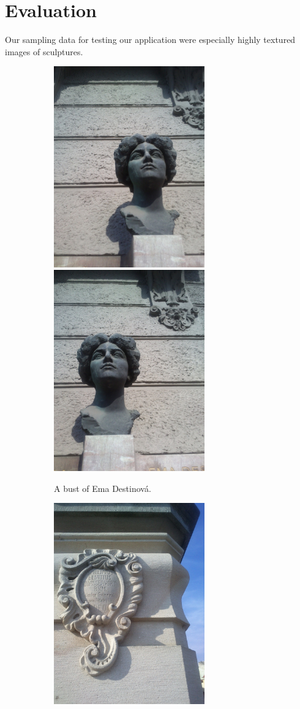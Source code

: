 \chapter{Evaluation}
\label{chap:eval}

Our sampling data for testing our application were especially highly textured images of sculptures.

\begin{figure}[H]
\centering
\begin{subfigure}[b]{0.45\textwidth}
\centering
\includegraphics[width=6.5cm]{img/ema_a.png}
\centering
\includegraphics[width=6.5cm]{img/ema_b.png}
\caption{A bust of Ema Destinová.} \label{sample1}
\end{subfigure}
\begin{subfigure}[b]{0.45\textwidth}
\centering
\includegraphics[width=6.5cm]{img/memorial_b.png}

\end{subfigure}
\end{figure}
